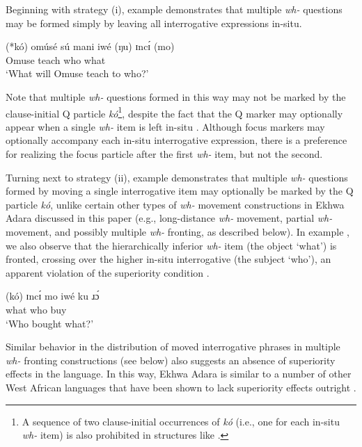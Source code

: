 \documentclass[output=paper,colorlinks,citecolor=brown
]{langscibook}
\begin{document}
Beginning with strategy (i), example  demonstrates that multiple \textit{wh-} questions may be formed simply by leaving all interrogative expressions in-situ.

\ea \label{ex:matte:20}
\gll (*kó) omúsé sú mani iwé (ŋu) ɪncɪ́ (mo)\\
\Q{} Omuse \Fut{} teach who \Foc{} what \Foc{}\\
\glt `What will Omuse teach to who?'
\z

\noindent Note that multiple \textit{wh-} questions formed in this way may not be marked by the clause-initial Q particle \textit{kó}\footnote{A sequence of two clause-initial occurrences of \textit{kó} (i.e., one for each in-situ \textit{wh-} item) is also prohibited in structures like .}, despite the fact that the Q marker may optionally appear when a single \textit{wh-} item is left in-situ . Although focus markers may optionally accompany each in-situ interrogative expression, there is a preference for realizing the focus particle after the first \textit{wh-} item, but not the second. 

Turning next to strategy (ii), example  demonstrates that multiple \textit{wh-} questions formed by moving a single interrogative item may optionally be marked by the Q particle \textit{kó}, unlike certain other types of \textit{wh-} movement constructions in Ekhwa Adara discussed in this paper (e.g., long-distance \textit{wh-} movement, partial \textit{wh-} movement, and possibly multiple \textit{wh-} fronting, as described below). In example , we also observe that the hierarchically inferior \textit{wh-} item (the object `what') is fronted, crossing over the higher in-situ interrogative (the subject `who'), an apparent violation of the superiority condition \citep{KunoRobinson1972, Chomsky1973, Chomsky1977}. 

\ea \label{ex:matte:21}
\gll (kó) ɪncɪ́ mo iwé ku ɹɔ́	{\longrule}\\
\Q{} what \Foc{} who \Pfv{} buy {}\\ 
\glt `Who bought what?'
\z

\noindent Similar behavior in the distribution of moved interrogative phrases in multiple \textit{wh-} fronting constructions (see below) also suggests an absence of superiority effects in the language. In this way, Ekhwa Adara is similar to a number of other West African languages that have been shown to lack superiority effects outright \citep{Saah1994, Adesola2005, Adesola2006, TorrenceKandybowicz2015, KandybowiczKatsuda2023, SchurrTapia2023}.
\end{document}
